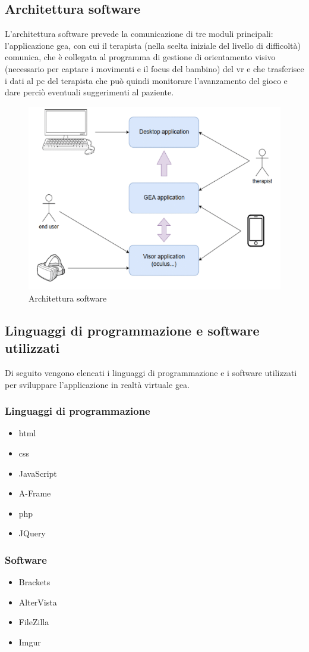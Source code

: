 \subsection{Architettura software} \label{subsec:soft}
L'architettura software prevede la comunicazione di tre moduli principali: l'applicazione \acs{gea}, con cui il terapista (nella scelta iniziale del livello di difficoltà) comunica, che è collegata al programma di gestione di orientamento visivo (necessario per captare i movimenti e il focus del bambino) del \acs{vr} e che trasferisce i dati al \acs{pc} del terapista che può quindi monitorare l'avanzamento del gioco e dare perciò eventuali suggerimenti al paziente.
\vspace{70pt}
\begin{figure}[htbp]
\centering
\includegraphics[width=\textwidth]{Images/software}
\caption{Architettura software}
\label{fig:software}
\end{figure}
\clearpage

\subsection{Linguaggi di programmazione e software utilizzati} \label{subsec:ling}
Di seguito vengono elencati i linguaggi di programmazione e i software utilizzati per sviluppare l'applicazione in realtà virtuale \acs{gea}.
\subsubsection{Linguaggi di programmazione}
\begin{itemize}
	\item \acs{html}
	\item \acs{css}
	\item JavaScript
	\item A-Frame
	\item \acs{php}
	\item JQuery
\end{itemize}
\subsubsection{Software}
\begin{itemize}
	\item Brackets
	\item AlterVista
	\item FileZilla
	\item Imgur
\end{itemize}